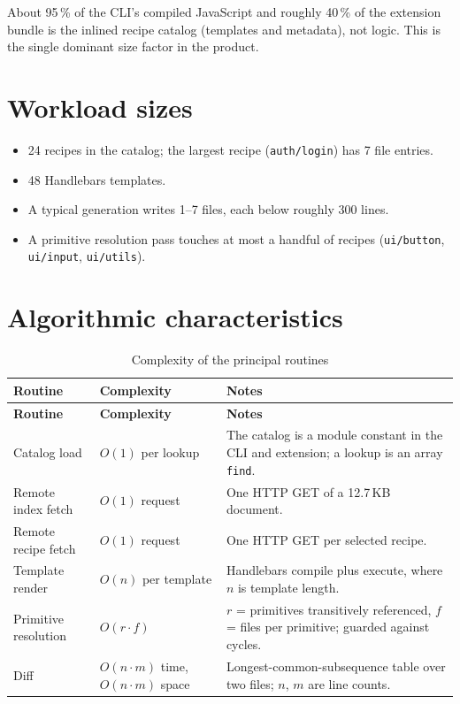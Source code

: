About 95\,\% of the CLI's compiled JavaScript and roughly 40\,\% of the
extension bundle is the inlined recipe catalog (templates and metadata), not
logic. This is the single dominant size factor in the product.

\section{Workload sizes}

\begin{itemize}
  \item 24 recipes in the catalog; the largest recipe (\texttt{auth/login}) has
        7 file entries.
  \item 48 Handlebars templates.
  \item A typical generation writes 1--7 files, each below roughly 300 lines.
  \item A primitive resolution pass touches at most a handful of recipes
        (\texttt{ui/button}, \texttt{ui/input}, \texttt{ui/utils}).
\end{itemize}

\section{Algorithmic characteristics}

\begin{longtable}{@{}L{4.2cm}L{3.4cm}L{6.2cm}@{}}
\caption{Complexity of the principal routines}\\
\toprule
\textbf{Routine} & \textbf{Complexity} & \textbf{Notes} \\
\midrule
\endfirsthead
\toprule
\textbf{Routine} & \textbf{Complexity} & \textbf{Notes} \\
\midrule
\endhead
Catalog load & $O(1)$ per lookup & The catalog is a module constant in the CLI and
extension; a lookup is an array \texttt{find}. \\
Remote index fetch & $O(1)$ request & One HTTP GET of a 12.7\,KB document. \\
Remote recipe fetch & $O(1)$ request & One HTTP GET per selected recipe. \\
Template render & $O(n)$ per template & Handlebars compile plus execute, where $n$ is
template length. \\
Primitive resolution & $O(r \cdot f)$ & $r$ = primitives transitively referenced, $f$
= files per primitive; guarded against cycles. \\
Diff & $O(n \cdot m)$ time, $O(n \cdot m)$ space & Longest-common-subsequence
table over two files; $n$, $m$ are line counts. \\
\bottomrule
\end{longtable}

